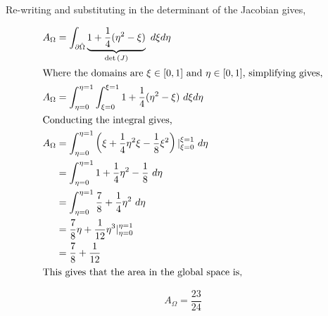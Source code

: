 \begin{enumerate}[label = \alph*., start = 1]
    Re-writing and substituting in the determinant of the Jacobian gives,

    \vspace{-0.35in}
    \begin{align*}
        A_{\Omega} & = \int_{\partial \hat{\Omega}} \underbrace{1 + \frac{1}{4}(\eta^2 - \xi)}_{\det{(J)}}\ d\xi d\eta\\
        \shortintertext{Where the domains are $\xi \in [0,1]$ and $\eta \in [0, 1]$, simplifying gives,}
        A_{\Omega} & = \int_{\eta = 0}^{\eta = 1}\int_{\xi = 0}^{\xi = 1} 1 + \frac{1}{4}(\eta^2 - \xi)\ d\xi d\eta\\
        \shortintertext{Conducting the integral gives,}
        A_{\Omega} & = \int_{\eta = 0}^{\eta = 1} \left(\xi + \frac{1}{4}\eta^2\xi - \frac{1}{8}\xi^2\right)|_{\xi = 0}^{\xi = 1}\ d\eta\\
            & = \int_{\eta = 0}^{\eta = 1} 1 + \frac{1}{4}\eta^2 - \frac{1}{8}\ d\eta\\
            & = \int_{\eta = 0}^{\eta = 1} \frac{7}{8} + \frac{1}{4}\eta^2\ d\eta\\
            & = \frac{7}{8}\eta + \frac{1}{12}\eta^3|_{\eta = 0}^{\eta = 1}\\
            & = \frac{7}{8} + \frac{1}{12}\\
        \shortintertext{This gives that the area in the global space is,}
    \end{align*}

    \vspace{-0.35in}
    \begin{equation*}
        \boxed{A_{\Omega} = \frac{23}{24}}
    \end{equation*}
\end{enumerate}